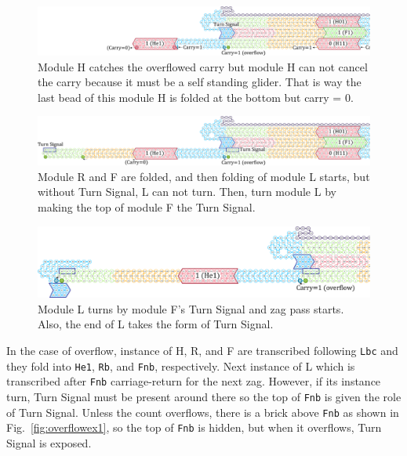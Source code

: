 \documentclass[runningheads]{llncs}
\begin{document}
\begin{figure}[tb]
\centering
\includegraphics[width=\linewidth]{fig/svg/CounterEx15_1.pdf}
\caption{
Module H catches the overflowed carry but module H can not cancel the carry because it must be a self standing glider.
That is way the last bead of this module H is folded at the bottom but carry = 0. 
}
\label{fig:overflowex3}
\end{figure}


\begin{figure}[tb]
\centering
\includegraphics[width=\linewidth]{fig/svg/CounterEx17_1.pdf}
\caption{
Module R and F are folded, and then folding of module L starts, but without Turn Signal, L can not turn.
Then, turn module L by making the top of module F the Turn Signal.
}
\label{fig:overflowex4}
\end{figure}

\begin{figure}[tb]
\centering
\includegraphics[width=\linewidth]{fig/svg/CounterEx18_1.pdf}
\caption{
Module L turns by module F's Turn Signal and zag pass starts.
Also, the end of L takes the form of Turn Signal.
}
\label{fig:overflowex5}
\end{figure}



In the case of overflow, instance of H,  R, and F are transcribed following \texttt{Lbc} and they fold into \texttt{He1}, \texttt{Rb}, and \texttt{Fnb}, respectively.
Next instance of L which is transcribed after \texttt{Fnb} carriage-return for the next zag.
However, if its instance turn, Turn Signal must be present around there so the top of \texttt{Fnb} is given the role of Turn Signal.
Unless the count overflows, there is a brick above \texttt{Fnb} as shown in Fig.~\ref{fig:overflowex1}, so the top of \texttt{Fnb} is hidden, but when it overflows, Turn Signal is exposed.
\end{document}
